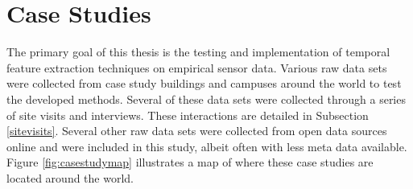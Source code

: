 \section{Case Studies}
\label{sec:casestudies}

The primary goal of this thesis is the testing and implementation of temporal feature extraction techniques on empirical sensor data. Various raw data sets were collected from case study buildings and campuses around the world to test the developed methods. Several of these data sets were collected through a series of site visits and interviews. These interactions are detailed in Subsection \ref{sitevisits}. Several other raw data sets were collected from open data sources online and were included in this study, albeit often with less meta data available. Figure \ref{fig:casestudymap} illustrates a map of where these case studies are located around the world.